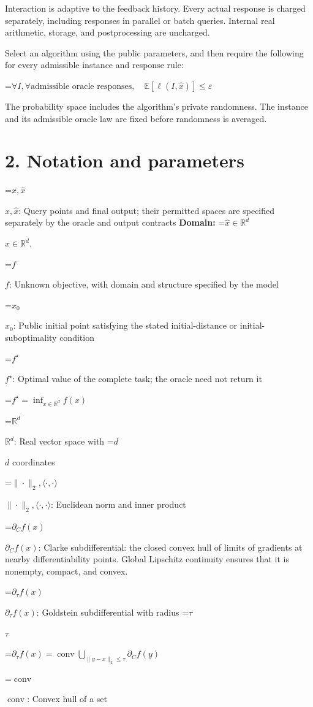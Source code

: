\documentclass[10pt,a4paper]{article}
\newcommand{\AtlasMath}[1]{\par\begingroup\centering\setbox0=\hbox{$\displaystyle #1$}\ifdim\wd0>1.4\linewidth\typeout{ATLAS WIDE FORMULA: \the\wd0}\fi\ifdim\wd0>\linewidth\resizebox{\linewidth}{!}{\box0}\else\box0\fi\par\endgroup}
\newcommand{\AtlasInlineMath}[1]{\begingroup\setbox0=\hbox{$#1$}\ifdim\wd0>.4\linewidth\endgroup\AtlasMath{#1}\else\endgroup$#1$\fi}
\begin{document}
Interaction is adaptive to the feedback history. Every actual response is charged separately, including responses in parallel or batch queries. Internal real arithmetic, storage, and postprocessing are uncharged.

Select an algorithm using the public parameters, and then require the following for every admissible instance and response rule:


\AtlasMath{\forall I,\forall\text{admissible oracle responses},\quad\mathbb{E}[\ell(I,\widehat{x})]\le\varepsilon}


The probability space includes the algorithm's private randomness. The instance and its admissible oracle law are fixed before randomness is averaged.

\section{2. Notation and parameters}
\AtlasInlineMath{x,\widehat{x}}: Query points and final output; their permitted spaces are specified separately by the oracle and output contracts \textbf{Domain:} \AtlasInlineMath{\widehat{x}\in \mathbb{R}^d}.

\AtlasInlineMath{f}: Unknown objective, with domain and structure specified by the model

\AtlasInlineMath{x_0}: Public initial point satisfying the stated initial-distance or initial-suboptimality condition

\AtlasInlineMath{f^\star}: Optimal value of the complete task; the oracle need not return it


\AtlasMath{f^\star=\inf_{x\in \mathbb{R}^d}f(x)}


\AtlasInlineMath{\mathbb{R}^d}: Real vector space with \AtlasInlineMath{d} coordinates

\AtlasInlineMath{\|\cdot\|_2,\langle\cdot,\cdot\rangle}: Euclidean norm and inner product

\AtlasInlineMath{\partial_C f(x)}: Clarke subdifferential: the closed convex hull of limits of gradients at nearby differentiability points. Global Lipschitz continuity ensures that it is nonempty, compact, and convex.

\AtlasInlineMath{\partial_\tau f(x)}: Goldstein subdifferential with radius \AtlasInlineMath{\tau}


\AtlasMath{\partial_\tau f(x)=\operatorname{conv}\bigcup_{\|y-x\|_2\le\tau}\partial_C f(y)}


\AtlasInlineMath{\operatorname{conv}}: Convex hull of a set
\end{document}

